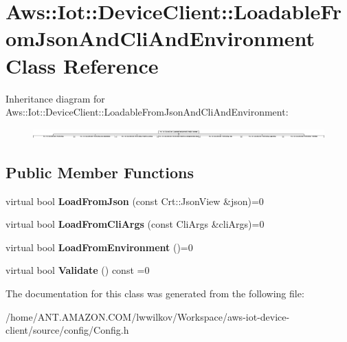 \hypertarget{class_aws_1_1_iot_1_1_device_client_1_1_loadable_from_json_and_cli_and_environment}{}\section{Aws\+:\+:Iot\+:\+:Device\+Client\+:\+:Loadable\+From\+Json\+And\+Cli\+And\+Environment Class Reference}
\label{class_aws_1_1_iot_1_1_device_client_1_1_loadable_from_json_and_cli_and_environment}
Inheritance diagram for Aws\+:\+:Iot\+:\+:Device\+Client\+:\+:Loadable\+From\+Json\+And\+Cli\+And\+Environment\+:\begin{figure}[H]
\begin{center}
\leavevmode
\includegraphics[height=0.403023cm]{class_aws_1_1_iot_1_1_device_client_1_1_loadable_from_json_and_cli_and_environment}
\end{center}
\end{figure}
\subsection*{Public Member Functions}
\begin{DoxyCompactItemize}
\item 
\mbox{\label{class_aws_1_1_iot_1_1_device_client_1_1_loadable_from_json_and_cli_and_environment_adaa0942506f6322df4b46bb7cf79cdcf}} 
virtual bool {\bfseries Load\+From\+Json} (const Crt\+::\+Json\+View \&json)=0
\item 
\mbox{\label{class_aws_1_1_iot_1_1_device_client_1_1_loadable_from_json_and_cli_and_environment_abbf0e30b0d353c5a89c021ee3e89d8d2}} 
virtual bool {\bfseries Load\+From\+Cli\+Args} (const Cli\+Args \&cli\+Args)=0
\item 
\mbox{\label{class_aws_1_1_iot_1_1_device_client_1_1_loadable_from_json_and_cli_and_environment_ab5ea0846ea91b7ceb472a48c7f4b49ad}} 
virtual bool {\bfseries Load\+From\+Environment} ()=0
\item 
\mbox{\label{class_aws_1_1_iot_1_1_device_client_1_1_loadable_from_json_and_cli_and_environment_a260957ac4b9f9ec3be06876b6a75f129}} 
virtual bool {\bfseries Validate} () const =0
\end{DoxyCompactItemize}


The documentation for this class was generated from the following file\+:\begin{DoxyCompactItemize}
\item 
/home/\+A\+N\+T.\+A\+M\+A\+Z\+O\+N.\+C\+O\+M/lwwilkov/\+Workspace/aws-\/iot-\/device-\/client/source/config/Config.\+h\end{DoxyCompactItemize}
